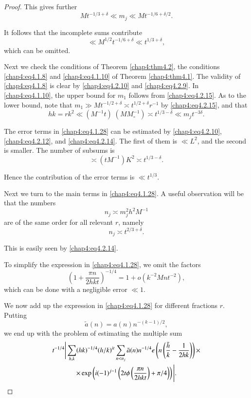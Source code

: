 \begin{proof}
This gives further
\begin{equation}\label{chap4:eq4.2.15}
Mt^{-1/3+\delta}\ll m_j\ll Mt^{-1/6+\delta/2}.
\end{equation}

It follows that the incomplete sums contribute 
$$
\ll M^{1/2}t^{-1/6+\delta}\ll t^{1/3+\delta},
$$
which can be omitted.

Next we check the conditions of Theorem \ref{chap4:thm4.2}, \ie the conditions \eqref{chap4:eq4.1.8} and \eqref{chap4:eq4.1.10} of Theorem \ref{chap4:thm4.1}. The validity of \eqref{chap4:eq4.1.8} is clear by \eqref{chap4:eq4.2.10} and \eqref{chap4:eq4.2.9}. In \eqref{chap4:eq4.1.10}, the upper bound for $m_1$ follows from \eqref{chap4:eq4.2.15}. As to the lower bound, note that $m_1\gg Mt^{-1/2+\delta}\asymp t^{1/2+\delta}r^{-1}$ by \eqref{chap4:eq4.2.15}, and that 
$$
hk=rk^2\ll \left(M^{-1}t\right)\;\left(MM_\circ^{-1}\right)\asymp t^{1/3-\delta} \ll m_j t^{-3\delta}.
$$

The error terms in \eqref{chap4:eq4.1.28} can be estimated by \eqref{chap4:eq4.2.10}, \eqref{chap4:eq4.2.12}, and \eqref{chap4:eq4.2.14}. The first of them is $\ll L^2$, and the second is smaller. The number of subsums is 
$$
\asymp\left(tM^{-1}\right)K^2\asymp t^{1/3-\delta}.
$$

Hence the contribution of the error terms is $\ll t^{1/3}$.

Next we turn to the main terms in \eqref{chap4:eq4.1.28}. A useful observation will be that the numbers
$$
n_j\asymp m_j^2h^2M^{-1}
$$
are of the same order for all relevant $r$, namely 
\begin{equation}\label{chap4:eq4.2.16}
n_j\asymp t^{2/3+\delta}.
\end{equation}\pageoriginale

This is easily seen by \eqref{chap4:eq4.2.14}.

To simplify the expression in \eqref{chap4:eq4.1.28}, we omit the factors
$$
\left(1+\frac{\pi n}{2hkt}\right)^{-1/4}=1+o\left(k^{-2}Mnt^{-2}\right),
$$
which can be done with a negligible error $\ll 1$.

We now add up the expression in \eqref{chap4:eq4.1.28} for different fractions $r$. Putting
$$
\tilde{a}(n)=a(n)n^{-(k -1)/2},
$$
we end up with the problem of estimating the multiple sum 
\begin{gather}
t^{-1/4}\Bigg|\sum\limits_{h,k}(hk)^{-1/4}(h/k)^{it}\sum\limits_{n<n_j}
\tilde{a}(n)n^{-1/4}e\left(n\left(\frac{\bar{h}}{k}-\frac{1}{2hk}\right)
\right)\times\label{chap4:eq4.2.17}\\ 
\times \exp\left(i(-1)^{j-1}\left(2t\phi\left(\frac{\pi n}{2hkt}
\right)+\pi/4\right)\right)\Bigg|.\notag 
\end{gather}


\end{proof}
